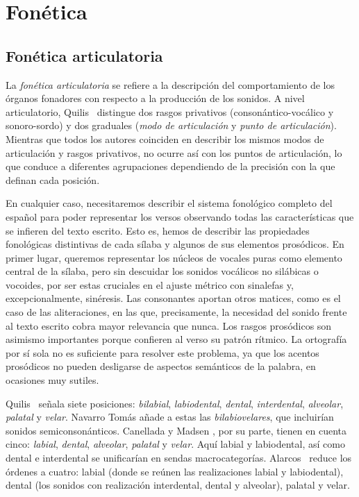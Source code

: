 \section{Fonética}
\subsection{Fonética articulatoria}
La \textit{fonética articulatoria} se refiere a la descripción del comportamiento de los órganos fonadores con respecto a la producción de los sonidos. A nivel articulatorio, Quilis~\parencite*[28-56]{quilis2019} distingue dos rasgos privativos (consonántico-vocálico y sonoro-sordo) y dos graduales (\textit{modo de articulación} y \textit{punto de articulación}). Mientras que todos los autores coinciden en describir los mismos modos de articulación y rasgos privativos, no ocurre así con los puntos de articulación, lo que conduce a diferentes agrupaciones dependiendo de la precisión con la que definan cada posición.

En cualquier caso, necesitaremos describir el sistema fonológico completo del español para poder representar los versos observando todas las características que se infieren del texto escrito. Esto es, hemos de describir las propiedades fonológicas distintivas de cada sílaba y algunos de sus elementos prosódicos. En primer lugar, queremos representar los núcleos de vocales puras como elemento central de la sílaba, pero sin descuidar los sonidos vocálicos no silábicas o vocoides, por ser estas cruciales en el ajuste métrico con sinalefas y, excepcionalmente, sinéresis. Las consonantes aportan otros matices, como es el caso de las aliteraciones, en las que, precisamente, la necesidad del sonido frente al texto escrito cobra mayor relevancia que nunca. Los rasgos prosódicos son asimismo importantes porque confieren al verso su patrón rítmico. La ortografía por sí sola no es suficiente para resolver este problema, ya que los acentos prosódicos no pueden desligarse de aspectos semánticos de la palabra, en ocasiones muy sutiles.

Quilis~\parencite*{quilis2019} señala siete posiciones: \textit{bilabial}, \textit{labiodental}, \textit{dental}, \textit{interdental}, \textit{alveolar}, \textit{palatal} y \textit{velar}. Navarro Tomás \parencite*[12]{navarrotomas2004} añade a estas las \textit{bilabiovelares}, que incluirían sonidos semiconsonánticos. Canellada y Madsen \parencite*{canellada1987}, por su parte, tienen en cuenta cinco: \textit{labial}, \textit{dental}, \textit{alveolar}, \textit{palatal} y \textit{velar}. Aquí labial y labiodental, así como dental e interdental se unificarían en sendas macrocategorías. Alarcos~\parencite*{alarcos1964} reduce los órdenes a cuatro: labial (donde se reúnen las realizaciones labial y labiodental), dental (los sonidos con realización interdental, dental y alveolar), palatal y velar.



